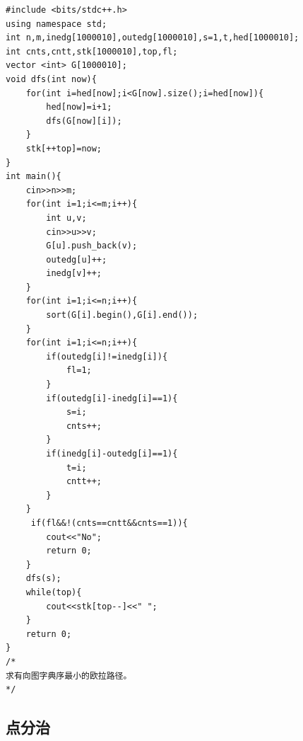 \documentclass[11pt,a4paper]{ctexart}
\begin{document}
\begin{lstlisting}
#include <bits/stdc++.h>
using namespace std;
int n,m,inedg[1000010],outedg[1000010],s=1,t,hed[1000010];
int cnts,cntt,stk[1000010],top,fl;
vector <int> G[1000010];
void dfs(int now){
	for(int i=hed[now];i<G[now].size();i=hed[now]){ 
		hed[now]=i+1;
		dfs(G[now][i]);
	}
	stk[++top]=now;
}
int main(){
	cin>>n>>m;
    for(int i=1;i<=m;i++){
    	int u,v;
		cin>>u>>v;
		G[u].push_back(v);
		outedg[u]++;
		inedg[v]++;  
    }
    for(int i=1;i<=n;i++){
   		sort(G[i].begin(),G[i].end());
	}
    for(int i=1;i<=n;i++){
    	if(outedg[i]!=inedg[i]){
    		fl=1;
		}
        if(outedg[i]-inedg[i]==1){
			s=i;
			cnts++;
        }
        if(inedg[i]-outedg[i]==1){
        	t=i;
			cntt++;
        }
    }
     if(fl&&!(cnts==cntt&&cnts==1)){
		cout<<"No";
		return 0;
    }
    dfs(s);
    while(top){
    	cout<<stk[top--]<<" ";
	}
    return 0; 
}
/*
求有向图字典序最小的欧拉路径。
*/
\end{lstlisting}

\subsection{点分治}
\end{document}
